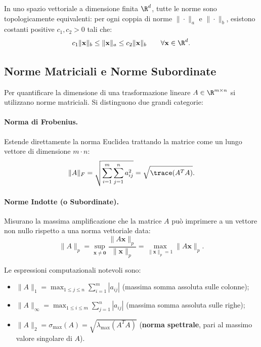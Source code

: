 \begin{property}
In uno spazio vettoriale a dimensione finita $\R^d$, tutte le norme sono topologicamente equivalenti: per ogni coppia di norme $\|\cdot\|_a$ e $\|\cdot\|_b$, esistono costanti positive $c_1, c_2 > 0$ tali che:
\begin{equation}
    c_1 \|\mathbf{x}\|_b \le \|\mathbf{x}\|_a \le c_2 \|\mathbf{x}\|_b \qquad \forall \mathbf{x} \in \R^d.
\end{equation}
\end{property}

\subsection{Norme Matriciali e Norme Subordinate}

Per quantificare la dimensione di una trasformazione lineare $A \in \R^{m \times n}$ si utilizzano norme matriciali. Si distinguono due grandi categorie:

\paragraph{Norma di Frobenius.}
Estende direttamente la norma Euclidea trattando la matrice come un lungo vettore di dimensione $m \cdot n$:
\begin{equation}
    \|A\|_F = \sqrt{\sum_{i=1}^m \sum_{j=1}^n a_{ij}^2} = \sqrt{\trace(A^T A)}.
\end{equation}

\paragraph{Norme Indotte (o Subordinate).}
Misurano la massima amplificazione che la matrice $A$ può imprimere a un vettore non nullo rispetto a una norma vettoriale data:
\begin{equation}
    \|A\|_p = \sup_{\mathbf{x} \ne \mathbf{0}} \frac{\|A \mathbf{x}\|_p}{\|\mathbf{x}\|_p} = \max_{\|\mathbf{x}\|_p = 1} \|A \mathbf{x}\|_p.
\end{equation}

Le espressioni computazionali notevoli sono:
\begin{itemize}
    \item $\|A\|_1 = \max_{1 \le j \le n} \sum_{i=1}^m |a_{ij}|$ (massima somma assoluta sulle colonne);
    \item $\|A\|_\infty = \max_{1 \le i \le m} \sum_{j=1}^n |a_{ij}|$ (massima somma assoluta sulle righe);
    \item $\|A\|_2 = \sigma_{\max}(A) = \sqrt{\lambda_{\max}(A^T A)}$ (\textbf{norma spettrale}, pari al massimo valore singolare di $A$).
\end{itemize}

